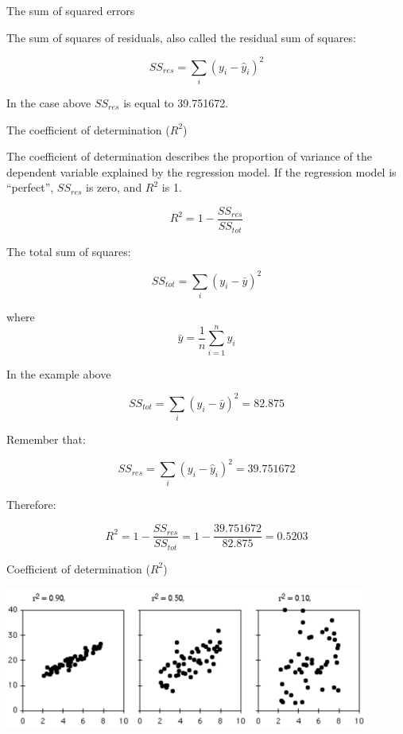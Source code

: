 \documentclass{beamer}
\begin{document}
\begin{frame}
{\centerline{The sum of squared errors}}

The sum of squares of residuals, also called the residual sum of squares:

$$SS_{res} = \sum_i (y_i - \hat{y}_i)^2$$

In the case above $SS_{res}$ is equal to 39.751672.

\end{frame}

\begin{frame}
{\centerline{The coefficient of determination ($R^2$)}}

The coefficient of determination describes the proportion of variance of the dependent variable explained by the regression model. If the regression model is “perfect”, $SS_{res}$ is zero, and $R^2$ is 1.

$$R^2 = 1 - \frac{SS_{res}}{SS_{tot}}$$

The total sum of squares:

$$SS_{tot} = \sum_i (y_i - \bar{y})^2$$

where 
$$\bar{y}=\frac{1}{n}\sum_{i=1}^n y_i$$

\end{frame}

\begin{frame}
{\centerline{In the example above}}

$$SS_{tot} = \sum_i (y_i - \bar{y})^2 = 82.875 $$

Remember that:

$$SS_{res} = \sum_i (y_i - \hat{y}_i)^2 = 39.751672$$

Therefore:

$$R^2 = 1 - \frac{SS_{res}}{SS_{tot}} = 1 - \frac{39.751672}{82.875} =  0.5203$$

\end{frame}

\begin{frame}
{\centerline{Coefficient of determination ($R^2$)}}


\begin{center}
\includegraphics[width=12cm]{A2022.IDSEPC.RegressioneLineare/r2.png}   
\end{center}
\end{frame}
\end{document}
